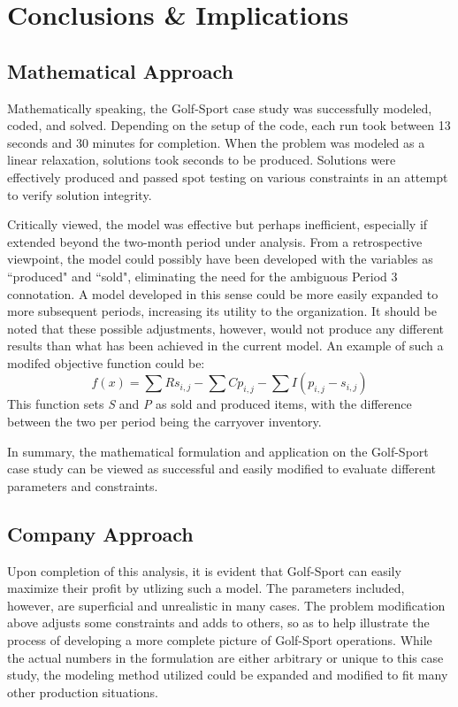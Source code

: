\documentclass{article}
\begin{document}
\section{Conclusions \& Implications}
\subsection{Mathematical Approach}
Mathematically speaking, the Golf-Sport case study was successfully modeled, coded, and solved.  Depending on the setup of the code, each run took between 13 seconds and 30 minutes for completion.  When the problem was modeled as a linear relaxation, solutions took seconds to be produced.  Solutions were effectively produced and passed spot testing on various constraints in an attempt to verify solution integrity.
\par
Critically viewed, the model was effective but perhaps inefficient, especially if extended beyond the two-month period under analysis.  From a retrospective viewpoint, the model could possibly have been developed with the variables as ``produced" and ``sold", eliminating the need for the ambiguous Period 3 connotation.  A model developed in this sense could be more easily expanded to more subsequent periods, increasing its utility to the organization.  It should be noted that these possible adjustments, however, would not produce any different results than what has been achieved in the current model.  An example of such a modifed objective function could be:
$$ f(x) = \sum Rs_{i,j} - \sum Cp_{i,j} - \sum I(p_{i,j}-s_{i,j}) $$
This function sets \textit{S} and \textit{P} as sold and produced items, with the difference between the two per period being the carryover inventory.
\par
In summary, the mathematical formulation and application on the Golf-Sport case study can be viewed as successful and easily modified to evaluate different parameters and constraints.
\subsection{Company Approach}
Upon completion of this analysis, it is evident that Golf-Sport can easily maximize their profit by utlizing such a model.  The parameters included, however, are superficial and unrealistic in many cases.  The problem modification above adjusts some constraints and adds to others, so as to help illustrate the process of developing a more complete picture of Golf-Sport operations.  While the actual numbers in the formulation are either arbitrary or unique to this case study, the modeling method utilized could be expanded and modified to fit many other production situations.
\end{document}
